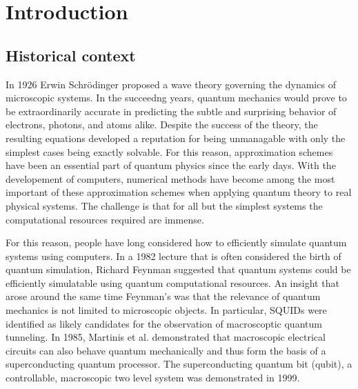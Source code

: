 \chapter{Introduction}\label{ch:introduction}
\section{Historical context}

In 1926 Erwin Schr\"odinger proposed a wave theory governing the dynamics of microscopic systems.\cite{Schrodinger1926}
In the succeedng years, quantum mechanics would prove to be extraordinarily accurate in predicting the subtle and surprising behavior of electrons, photons, and atoms alike.
Despite the success of the theory,
the resulting equations developed a reputation for being unmanagable with only the simplest cases being exactly solvable.
For this reason, approximation schemes have been an essential part of quantum physics since the early days.  %
With the developement of computers,
numerical methods have become among the most important of these approximation schemes when applying quantum theory to real physical systems.
The challenge is that for all but the simplest systems the computational resources required are immense.

For this reason, people have long considered how to efficiently simulate quantum systems using computers.
In a 1982 lecture that is often considered the birth of quantum simulation,
Richard Feynman suggested that quantum systems could be efficiently simulatable using quantum computational resources.\cite{Feynman1982}
An insight that arose around the same time Feynman's was that the relevance of quantum mechanics is not limited to microscopic objects.
In particular, SQUIDs were identified as likely candidates for the observation of macroscoptic quantum tunneling.\cite{Leggett1980}
In 1985, Martinis et al. demonstrated that macroscopic electrical circuits can also behave quantum mechanically and thus form the basis of a superconducting quantum processor.\cite{Martinis1985}
The superconducting quantum bit (qubit), a controllable, macroscopic two level system was demonstrated in 1999. \cite{Nakamura1999}

